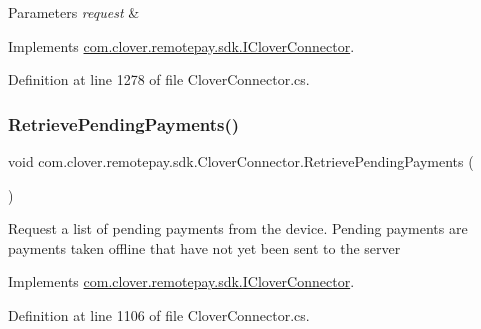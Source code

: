 \begin{DoxyParams}{Parameters}
{\em request} & \\
\hline
\end{DoxyParams}


Implements \hyperlink{interfacecom_1_1clover_1_1remotepay_1_1sdk_1_1_i_clover_connector_a3b85cfdb92b7c64d9b27decc49ca8b7c}{com.\+clover.\+remotepay.\+sdk.\+I\+Clover\+Connector}.



Definition at line 1278 of file Clover\+Connector.\+cs.

\mbox{\label{classcom_1_1clover_1_1remotepay_1_1sdk_1_1_clover_connector_a8ba5ef9b937ad8edc9cd5052826da2ed}} 
\subsubsection{\texorpdfstring{Retrieve\+Pending\+Payments()}{RetrievePendingPayments()}}
{\footnotesize\ttfamily void com.\+clover.\+remotepay.\+sdk.\+Clover\+Connector.\+Retrieve\+Pending\+Payments (\begin{DoxyParamCaption}{ }\end{DoxyParamCaption})}



Request a list of pending payments from the device. Pending payments are payments taken offline that have not yet been sent to the server 



Implements \hyperlink{interfacecom_1_1clover_1_1remotepay_1_1sdk_1_1_i_clover_connector_a5d371f91336d4950e32ff051061ad91d}{com.\+clover.\+remotepay.\+sdk.\+I\+Clover\+Connector}.



Definition at line 1106 of file Clover\+Connector.\+cs.

\mbox{\label{classcom_1_1clover_1_1remotepay_1_1sdk_1_1_clover_connector_af655f211944ed467d58eb816e5752c3c}} 
